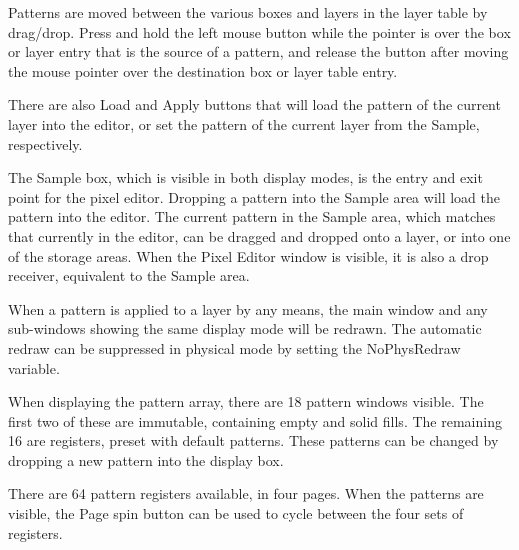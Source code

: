 Patterns are moved between the various boxes and layers in the layer
table by drag/drop.  Press and hold the left mouse button while the
pointer is over the box or layer entry that is the source of a
pattern, and release the button after moving the mouse pointer over
the destination box or layer table entry.

There are also {\cb Load} and {\cb Apply} buttons that will load the
pattern of the current layer into the editor, or set the pattern of
the current layer from the {\cb Sample}, respectively.

The {\cb Sample} box, which is visible in both display modes, is the
entry and exit point for the pixel editor.  Dropping a pattern into
the {\cb Sample} area will load the pattern into the editor.  The
current pattern in the {\cb Sample} area, which matches that currently
in the editor, can be dragged and dropped onto a layer, or into one of
the storage areas.  When the {\cb Pixel Editor} window is visible, it
is also a drop receiver, equivalent to the {\cb Sample} area.

When a pattern is applied to a layer by any means, the main window and
any sub-windows showing the same display mode will be redrawn.  The
automatic redraw can be suppressed in physical mode by setting the
{\cb NoPhysRedraw} variable.

When displaying the pattern array, there are 18 pattern windows
visible.  The first two of these are immutable, containing empty and
solid fills.  The remaining 16 are registers, preset with default
patterns.  These patterns can be changed by dropping a new pattern
into the display box.

There are 64 pattern registers available, in four pages.  When the
patterns are visible, the {\cb Page} spin button can be used to cycle
between the four sets of registers.

